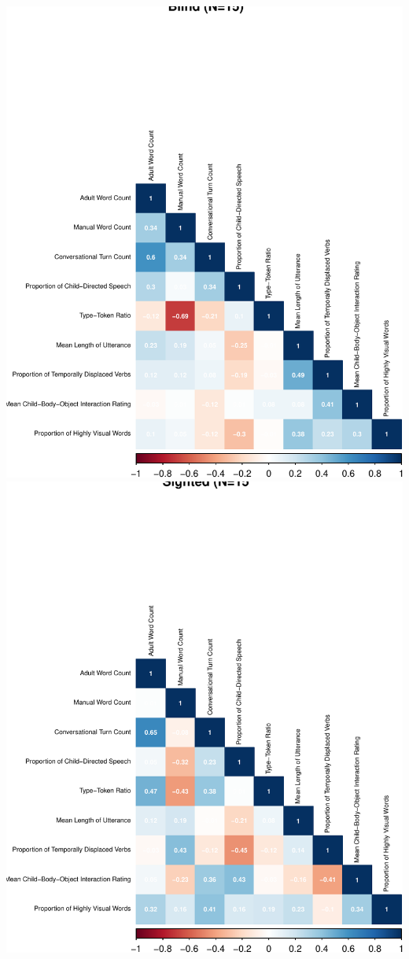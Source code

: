 \documentclass[
  man,floatsintext]{apa6}
\begin{document}
\includegraphics{input_quality_manuscript_files/figure-latex/compare-corrs-1.pdf} \includegraphics{input_quality_manuscript_files/figure-latex/compare-corrs-2.pdf}
\end{document}
